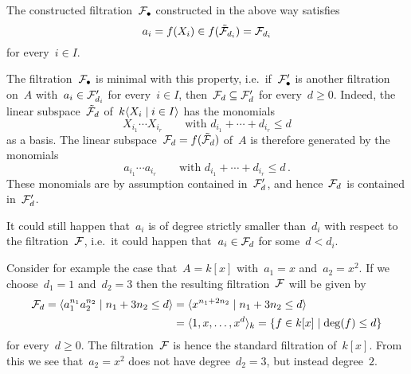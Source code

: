 The constructed filtration~$\mathcal{F}_\bullet$ constructed in the above way satisfies
\[
      a_i
  =   f(X_i)
  \in f(\tilde{\mathcal{F}}_{d_i})
  =   \mathcal{F}_{d_i}
\]
for every~$i \in I$.

\begin{remark}
  The filtration~$\mathcal{F}_\bullet$ is minimal with this property, i.e.\ if~$\mathcal{F}'_\bullet$ is another filtration on~$A$ with~$a_i \in \mathcal{F}'_{d_i}$ for every~$i \in I$, then~$\mathcal{F}_d \subseteq \mathcal{F}'_d$ for every~$d \geq 0$.
  Indeed, the linear subspace~$\tilde{\mathcal{F}}_d$ of~$k\gen{X_i \suchthat i \in I}$ has the monomials
  \[
    X_{i_1} \dotsm X_{i_r}
    \qquad
    \text{with~$d_{i_1} + \dotsb + d_{i_r} \leq d$}
  \]
  as a basis.
  The linear subspace~$\mathcal{F}_d = f(\tilde{\mathcal{F}}_d)$ of~$A$ is therefore generated by the monomials
  \[
    a_{i_1} \dotsm a_{i_r}
    \qquad
    \text{with~$d_{i_1} + \dotsb + d_{i_r} \leq d$} \,.
  \]
  These monomials are by assumption contained in~$\mathcal{F}'_d$, and hence~$\mathcal{F}_d$ is contained in~$\mathcal{F}'_d$.
\end{remark}

\begin{warning}
  It could still happen that~$a_i$ is of degree strictly smaller than~$d_i$ with respect to the filtration~$\mathcal{F}$, i.e.\ it could happen that~$a_i \in \mathcal{F}_d$ for some~$d < d_i$.
  
  Consider for example the case that~$A = k[x]$ with~$a_1 = x$ and~$a_2 = x^2$.
  If we choose~$d_1 = 1$ and~$d_2 = 3$ then the resulting filtration~$\mathcal{F}$ will be given by
  \begin{align*}
        \Fcal_d
     =  \gen{
          a_1^{n_1} a_2^{n_2}
        \suchthat
          n_1 + 3 n_2 \leq d
        }
    &=  \gen{
          x^{n_1 + 2 n_2}
        \suchthat
          n_1 + 3 n_2 \leq d
        } \\
    &=  \gen{1, x, \dotsc, x^d}_k
     =  \{
          f \in k[x]
        \suchthat
          \deg(f) \leq d
        \}
  \end{align*}
  for every~$d \geq 0$.
  The filtration~$\mathcal{F}$ is hence the standard filtration of~$k[x]$.
  From this we see that~$a_2 = x^2$ does not have degree~$d_2 = 3$, but instead degree~$2$.
\end{warning}

